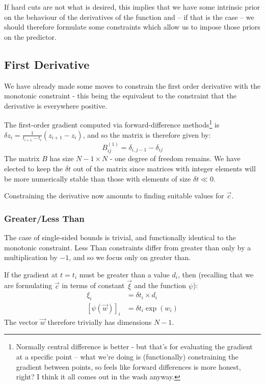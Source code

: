 \documentclass[]{article}
\begin{document}
		If hard cuts are not what is desired, this implies that we have some intrinsic prior on the behaviour of the derivatives of the function and -- if that is the case -- we should therefore formulate some constraints which allow us to impose those priors on the predictor.

		\subsection{First Derivative}

			We have already made some moves to constrain the first order derivative with the monotonic constraint - this being the equivalent to the constraint that the derivative is everywhere positive. 

			The first-order gradient computed via forward-difference methods\footnote{Normally central difference is better - but that's for evaluating the gradient at a specific point -- what we're doing is (functionally) constraining the gradient between points, so feels like forward differences is more honest, right? I think it all comes out in the wash anyway.} is $\delta z_i = \frac{1}{t_{i+1} - t_i} \left(z_{i+1} - z_i \right)$, and so the matrix is therefore given by:
			\begin{equation}
				B^{(1)}_{ij}  = \delta_{i,j-1} - \delta_{ij}
			\end{equation}
			The matrix $B$ has size $N-1\times N$ - one degree of freedom remains. We have elected to keep the $\delta t$ out of the matrix since matrices with integer elements will be more numerically stable than those with elements of size $\delta t \ll 0$.

			Constraining the derivative now amounts to finding suitable values for $\vec{c}$.

			\subsubsection{Greater/Less Than}

				The case of single-sided bounds is trivial, and functionally identical to the monotonic constraint. Less Than constraints differ from greater than only by a multiplication by $-1$, and so we focus only on greater than. 

				If the gradient at $t = t_i$ must be greater than a value $d_i$, then (recalling that we are formulating $\vec{c}$ in terms of constant $\vec{\xi}$ and the function $\psi$):
				\begin{align}
					\xi_i &  = \delta t_i \times d_i
					\\
					[\psi(\vec{w})]_i & = \delta t_i \exp(w_i)
				\end{align}
				The vector $\vec{w}$ therefore trivially has dimensions $N-1$.
\end{document}
